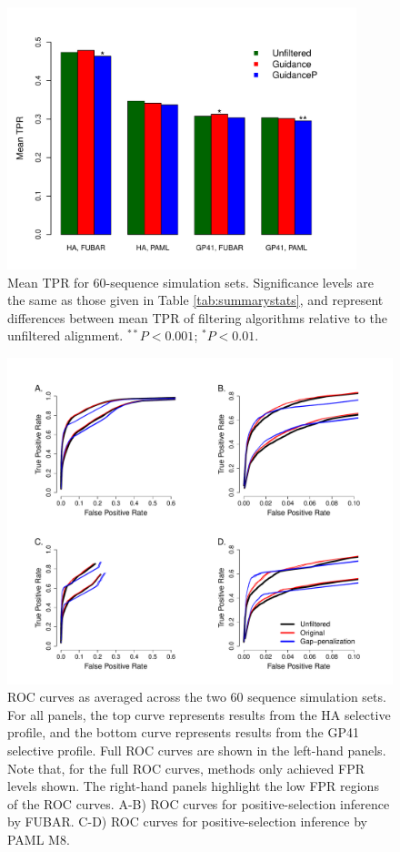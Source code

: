 \documentclass[11pt]{article}
\begin{document}
\bigskip

\begin{figure}[H]
\centerline{\includegraphics[width=4in]{Figures/barplot_prk.pdf}}
\caption{\label{barplot} Mean TPR for 60-sequence simulation sets. Significance levels are the same as those given in Table \ref{tab:summarystats}, and represent differences between mean TPR of filtering algorithms relative to the unfiltered alignment. $^{\ast\ast} P < 0.001$; $^{\ast} P < 0.01$. }
\end{figure}

\bigskip

\begin{figure}[H]
\centerline{\includegraphics[width=6in]{Figures/ROC_prk.pdf}}
\caption{\label{roc} ROC curves as averaged across the two 60 sequence simulation sets. For all panels, the top curve represents results from the HA selective profile, and the bottom curve represents results from the GP41 selective profile. Full ROC curves are shown in the left-hand panels. Note that, for the full ROC curves, methods only achieved FPR levels shown. The right-hand panels highlight the low FPR regions of the ROC curves. A-B) ROC curves for positive-selection inference by FUBAR. C-D) ROC curves for positive-selection inference by PAML M8.}
\end{figure}
\end{document}
